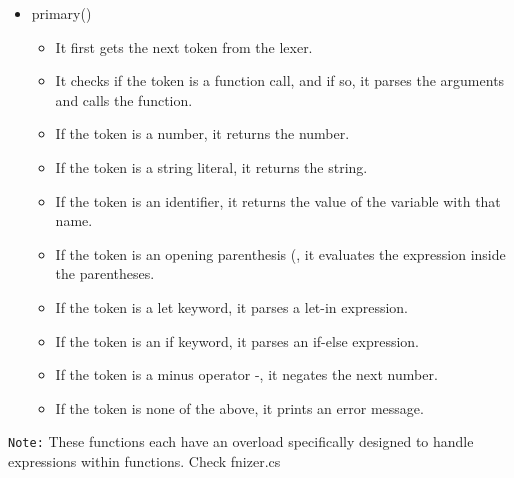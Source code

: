\begin{itemize}
\begin{itemize}
        \end{itemize}
    \item primary{()}
        \begin{itemize}
            \item It first gets the next token from the lexer.
            \item It checks if the token is a function call, and if so, it parses the arguments and calls the function.
            \item If the token is a number, it returns the number.
            \item If the token is a string literal, it returns the string.
            \item If the token is an identifier, it returns the value of the variable with that name.
            \item If the token is an opening parenthesis (, it evaluates the expression inside the parentheses.
            \item If the token is a let keyword, it parses a let-in expression.
            \item If the token is an if keyword, it parses an if-else expression.
            \item If the token is a minus operator -, it negates the next number.
            \item If the token is none of the above, it prints an error message.
        \end{itemize}
\end{itemize}

\texttt{Note:} These functions each have an overload specifically designed to handle expressions within functions. Check fnizer.cs

